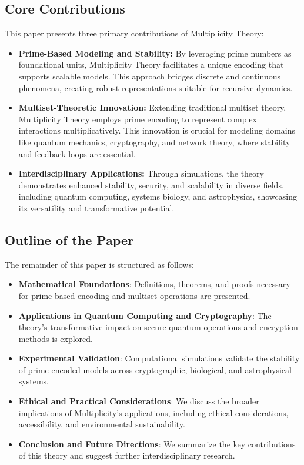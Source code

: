 \documentclass{article}
\theoremstyle{plain}
\begin{document}
\subsection{Core Contributions}
This paper presents three primary contributions of Multiplicity Theory:
\begin{itemize}
    \item \textbf{Prime-Based Modeling and Stability:} By leveraging prime numbers as foundational units, Multiplicity Theory facilitates a unique encoding that supports scalable models. This approach bridges discrete and continuous phenomena, creating robust representations suitable for recursive dynamics.
    \item \textbf{Multiset-Theoretic Innovation:} Extending traditional multiset theory, Multiplicity Theory employs prime encoding to represent complex interactions multiplicatively. This innovation is crucial for modeling domains like quantum mechanics, cryptography, and network theory, where stability and feedback loops are essential.
    \item \textbf{Interdisciplinary Applications:} Through simulations, the theory demonstrates enhanced stability, security, and scalability in diverse fields, including quantum computing, systems biology, and astrophysics, showcasing its versatility and transformative potential.
\end{itemize}

\subsection{Outline of the Paper}

The remainder of this paper is structured as follows:

\begin{itemize}

\item \textbf{Mathematical Foundations}: Definitions, theorems, and proofs necessary for prime-based encoding and multiset operations are presented. \item \textbf{Applications in Quantum Computing and Cryptography}: The theory’s transformative impact on secure quantum operations and encryption methods is explored. \item \textbf{Experimental Validation}: Computational simulations validate the stability of prime-encoded models across cryptographic, biological, and astrophysical systems. \item \textbf{Ethical and Practical Considerations}: We discuss the broader implications of Multiplicity’s applications, including ethical considerations, accessibility, and environmental sustainability. \item \textbf{Conclusion and Future Directions}: We summarize the key contributions of this theory and suggest further interdisciplinary research.
\end{itemize}
\end{document}
